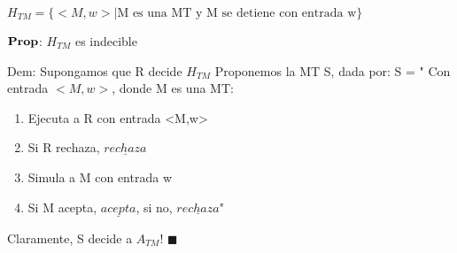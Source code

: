 \documentclass{homework}
\begin{document}
$H_{TM} = \{<M,w> | \text{M es una MT y M se detiene con entrada w}\}$

$\bf{Prop}$: $H_{TM}$ es indecible

Dem: Supongamos que R decide $H_{TM}$
Proponemos la MT S, dada por:
S = " Con entrada $<M,w>$, donde M es una MT:
\begin{enumerate}
	\item Ejecuta a R con entrada <M,w>
	\item Si R rechaza, $\underline{rechaza}$
	\item Simula a M con entrada w
	\item Si M acepta, $\underline{acepta}$, si no, $\underline{rechaza}$"
\end{enumerate}
Claramente, S decide a $A_{TM}$! $\blacksquare$
\end{document}
